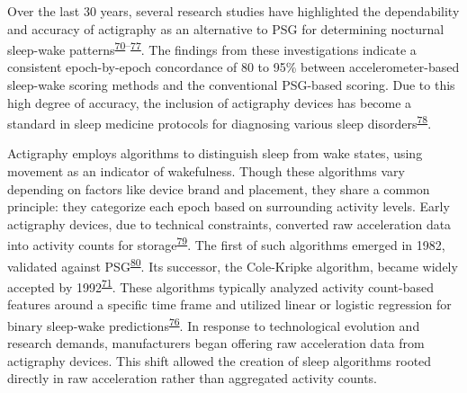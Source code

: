 \documentclass[
  10pt,
]{scrbook}
\begin{document}
Over the last 30 years, several research studies have highlighted the
dependability and accuracy of actigraphy as an alternative to PSG for
determining nocturnal sleep-wake
patterns\textsuperscript{\protect\hyperlink{ref-sadeh_activity-based_1994}{70}--\protect\hyperlink{ref-granovsky_actigraphy-based_2018}{77}}.
The findings from these investigations indicate a consistent
epoch-by-epoch concordance of 80 to 95\% between accelerometer-based
sleep-wake scoring methods and the conventional PSG-based scoring. Due
to this high degree of accuracy, the inclusion of actigraphy devices has
become a standard in sleep medicine protocols for diagnosing various
sleep disorders\textsuperscript{\protect\hyperlink{ref-smith_2018}{78}}.

Actigraphy employs algorithms to distinguish sleep from wake states,
using movement as an indicator of wakefulness. Though these algorithms
vary depending on factors like device brand and placement, they share a
common principle: they categorize each epoch based on surrounding
activity levels. Early actigraphy devices, due to technical constraints,
converted raw acceleration data into activity counts for
storage\textsuperscript{\protect\hyperlink{ref-neishabouri_2022}{79}}.
The first of such algorithms emerged in 1982, validated against
PSG\textsuperscript{\protect\hyperlink{ref-webster_activity-based_1982}{80}}.
Its successor, the Cole-Kripke algorithm, became widely accepted by
1992\textsuperscript{\protect\hyperlink{ref-cole_automatic_1992}{71}}.
These algorithms typically analyzed activity count-based features around
a specific time frame and utilized linear or logistic regression for
binary sleep-wake
predictions\textsuperscript{\protect\hyperlink{ref-sazonov_activity-based_2004}{76}}.
In response to technological evolution and research demands,
manufacturers began offering raw acceleration data from actigraphy
devices. This shift allowed the creation of sleep algorithms rooted
directly in raw acceleration rather than aggregated activity counts.
\end{document}
